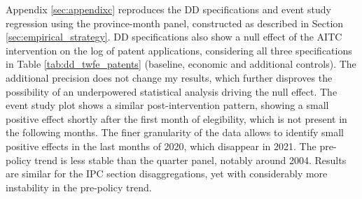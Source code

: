 \documentclass[../main.tex]{subfiles}
\begin{document}
Appendix \ref{sec:appendixc} reproduces the DD specifications and event study regression using the province-month panel, constructed as described in Section \ref{sec:empirical_strategy}. DD specifications also show a null effect of the AITC intervention on the log of patent applications, considering all three specifications in Table \ref{tab:dd_twfe_patents} (baseline, economic and additional controls). The additional precision does not change my results, which further disproves the possibility of an underpowered statistical analysis driving the null effect. The event study plot shows a similar post-intervention pattern, showing a small positive effect shortly after the first month of elegibility, which is not present in the following months. The finer granularity of the data allows to identify small positive effects in the last months of 2020, which disappear in 2021. The pre-policy trend is less stable than the quarter panel, notably around 2004. Results are similar for the IPC section disaggregations, yet with considerably more instability in the pre-policy trend. 
\end{document}
